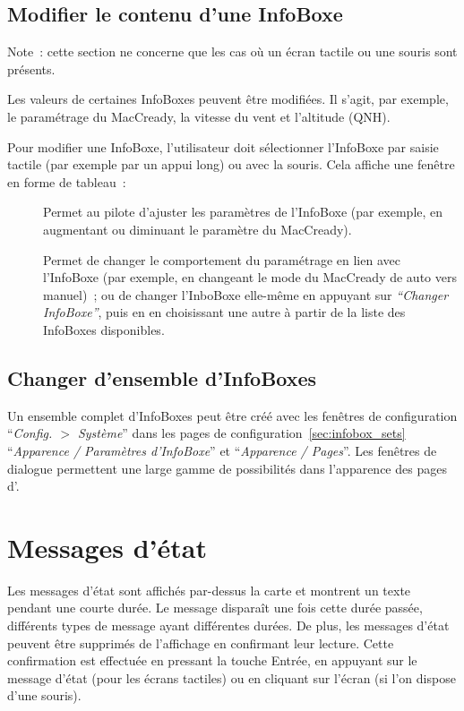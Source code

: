 \blink{}\blink{}\blink{}\blink{}


\subsection*{Modifier le contenu d'une InfoBoxe}

Note~: cette section ne concerne que les cas où un écran tactile ou une souris sont présents.

Les valeurs de certaines InfoBoxes peuvent être modifiées.
Il s'agit, par exemple, le paramétrage du MacCready, la vitesse du vent et l'altitude (QNH).

Pour modifier une InfoBoxe, l'utilisateur doit sélectionner l'InfoBoxe par saisie tactile
(par exemple par un appui long) ou avec la souris. Cela affiche une fenêtre en forme de tableau~:
\begin{description}
\item[]
  Permet au pilote d'ajuster les paramètres de l'InfoBoxe (par exemple, en augmentant ou diminuant le
  paramètre du MacCready).
\item[]
  Permet de changer le comportement du paramétrage en lien avec l'InfoBoxe
  (par exemple, en changeant le mode du MacCready de auto vers manuel)~; ou
  de changer l'InboBoxe elle-même en appuyant sur \emph{``Changer InfoBoxe''}, puis
  en en choisissant une autre à partir de la liste des InfoBoxes disponibles.
\end{description}




\subsection*{Changer d'ensemble d'InfoBoxes}

Un ensemble complet d'InfoBoxes peut être créé avec les fenêtres de configuration ``\emph{Config. $>$ Système}''
dans les pages de configuration~\ref{sec:infobox_sets} ``\emph{Apparence / Paramètres d'InfoBoxe}''
et ``\emph{Apparence / Pages}''.
Les fenêtres de dialogue permettent une large gamme de possibilités dans l'apparence des pages d'\xc{}.  


\section{Messages d'état}

Les messages d'état sont affichés par-dessus la carte et montrent un texte pendant une courte
durée. Le message disparaît une fois cette durée passée, différents
types de message ayant différentes durées. De plus, les messages d'état peuvent être
supprimés de l'affichage en confirmant leur lecture. Cette confirmation est effectuée en
pressant la touche Entrée, en appuyant sur le message
d'état (pour les écrans tactiles) ou en cliquant sur l'écran (si l'on dispose d'une souris).


